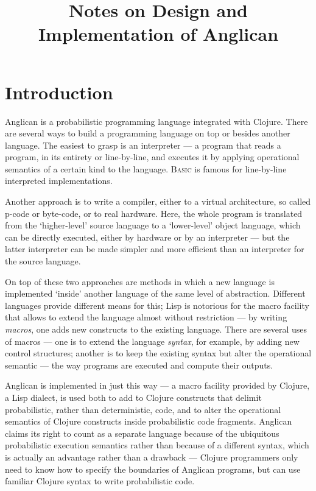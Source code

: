 \documentclass[a4paper]{article}
\title{Notes on Design and Implementation of Anglican}
\begin{document}
\maketitle

\begin{abstract}
\end{abstract}

\section{Introduction}

Anglican is a probabilistic programming language integrated with
Clojure.  There are several ways to build a programming language
on top or besides another language.  The easiest to grasp is an
interpreter --- a program that reads a program, in its entirety
or line-by-line, and executes it by applying operational
semantics of a certain kind to the language. \textsc{Basic} is
famous for line-by-line interpreted implementations.

Another approach is to write a compiler, either to a virtual
architecture, so called p-code or byte-code, or to real
hardware. Here, the whole program is translated from the
`higher-level' source language to a `lower-level' object
language, which can be directly executed, either by hardware or
by an interpreter --- but the latter interpreter can be made
simpler and more efficient  than an interpreter for the source
language.

On top of these two approaches are methods in which a new
language is implemented `inside' another language of the same
level of abstraction. Different languages provide different
means for this; Lisp is notorious for the macro facility
that allows to extend the language almost without
restriction --- by writing \textit{macros}, one adds new
constructs to the existing language. There are several uses of
macros --- one is to extend the language \textit{syntax}, for
example, by adding new control structures; another is to keep
the existing syntax but alter the operational semantic --- the
way programs are executed and compute their outputs.

Anglican is implemented in just this way --- a macro facility
provided by Clojure, a Lisp dialect, is used both to add to
Clojure constructs that delimit probabilistic, rather than
deterministic, code, and to alter the operational semantics of
Clojure constructs inside probabilistic code fragments. Anglican
claims its right to count as a separate language because of the
ubiquitous probabilistic execution semantics rather than because
of a different syntax, which is actually an advantage rather
than a drawback --- Clojure programmers only need to know how to
specify the boundaries of Anglican programs, but can use
familiar Clojure syntax to write probabilistic code. 
\end{document}

